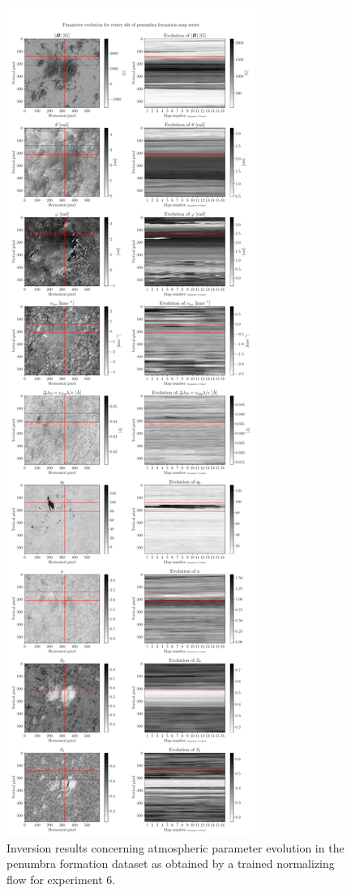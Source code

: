 \documentclass[a4paper,12pt]{report}
\begin{document}
\begin{figure}[h]
\centering
\includegraphics[height=\textheight-1cm]{figures/nf-milne-eddington-example-7-evolution1-nflows-piecewisequadratic.pdf}
\caption{Inversion results concerning atmospheric parameter evolution in the penumbra formation dataset as obtained by a trained normalizing flow for experiment 6.}
\label{fig:nf-milne-eddington-example-7-evolution1-nflows-piecewisequadratic}
\end{figure}
\end{document}
